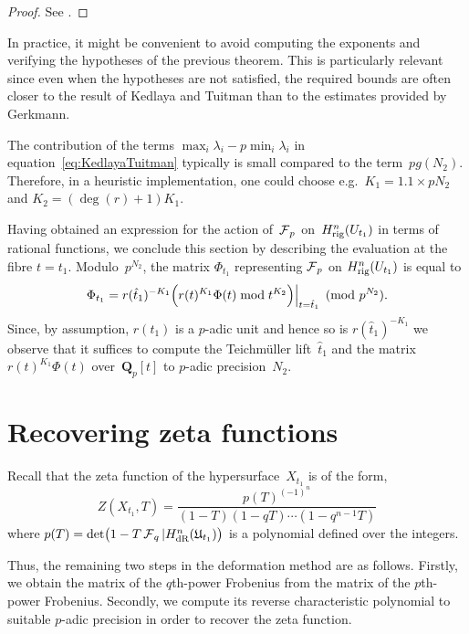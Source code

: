 \begin{proof}
See \citep[Theorem~2.1]{KedlayaTuitman2012}.
\end{proof}

\begin{rem} \label{rem:KedlayaTuitman}
In practice, it might be convenient to avoid computing the exponents and 
verifying the hypotheses of the previous theorem.  This is particularly 
relevant since even when the hypotheses are not satisfied, the required 
bounds are often closer to the result of Kedlaya and Tuitman than to the 
estimates provided by Gerkmann.

The contribution of the terms $\max_i \lambda_i - p \min_i \lambda_i$ 
in equation~\eqref{eq:KedlayaTuitman} typically is small compared to the 
term~$p g(N_2)$. Therefore, in a heuristic implementation, one 
could choose e.g.\ $K_1 = 1.1 \times p N_2$ and $K_2 = (\deg(r) + 1) K_1$.
\end{rem}

Having obtained an expression for the action of~$\operatorname{\mathcal{F}}_p$ 
on~$H_{\text{rig}}^{n}(U_{t_1})$ in terms of rational functions, 
we conclude this section by describing the evaluation at the fibre 
$t = t_1$.  Modulo~$p^{N_2}$, the matrix $\Phi_{t_1}$ representing 
$\operatorname{\mathcal{F}}_p$ on $H_{\text{rig}}^{n}(U_{t_1})$ is equal to 
\begin{equation}
\Phi_{t_1} = 
    r(\hat{t}_1)^{-K_1} 
    \Bigl( r(t)^{K_1} \Phi(t) \bmod{t^{K_2}} \Bigr) \Big\vert_{t=\hat{t}_1} \pmod{p^{N_2}}.
\end{equation}
Since, by assumption, $r(t_1)$ is a $p$-adic unit and hence so is 
$r(\hat{t}_1)^{-K_1}$ we observe that it suffices to compute the 
Teichm\"uller lift~$\hat{t}_1$ and the matrix~$r(t)^{K_1} \Phi(t)$ 
over~$\mathbf{Q}_p[t]$ to $p$-adic precision~$N_2$.

\section{Recovering zeta functions}

Recall that the zeta function of the hypersurface~$X_{t_1}$ is of the form,
\begin{equation*}
Z(X_{t_1},T) = \frac{p(T)^{(-1)^n}}{(1 - T) (1 - qT) \dotsm (1 - q^{n-1}T)}
\end{equation*}
where $p(T) = \det \bigl( 1 - T \operatorname{\mathcal{F}}_q | H_{\text{dR}}^n(\mathfrak{U}_{t_1}) \bigr)$ 
is a polynomial defined over the integers.

Thus, the remaining two steps in the deformation method are as follows.  
Firstly, we obtain the matrix of the $q$th-power Frobenius from the matrix of 
the $p$th-power Frobenius.  Secondly, we compute its reverse characteristic 
polynomial to suitable \mbox{$p$-adic} precision in order to recover the zeta 
function.

